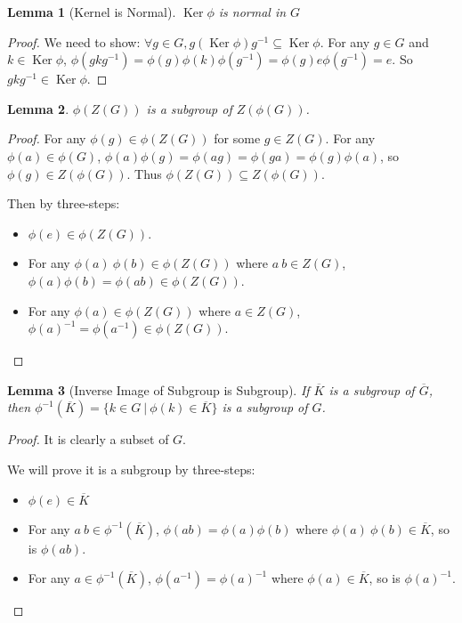 \documentclass[14pt]{extarticle}
\newtheorem{lemma}{Lemma}[section]
\DeclareMathOperator{\Ker}{Ker}
\newcommand{\inv}[1]{#1^{-1}}
\newcommand{\1}{\{e\}}
\begin{document}
\begin{lemma}[Kernel is Normal]
  $\Ker \phi$ is normal in $G$
\end{lemma}
\begin{proof}
  We need to show: $\forall g \in G, g (\Ker\phi) \inv{g} \subseteq \Ker\phi$.
  For any $g \in G$ and $k \in \Ker\phi$, 
  $\phi(gk\inv{g}) = \phi(g)\phi(k)\phi(\inv{g}) = \phi(g)e\phi(\inv{g}) = e$.
  So $gk\inv{g} \in \Ker\phi$.
\end{proof}

\begin{lemma}
  $\phi(Z(G))$ is a subgroup of $Z(\phi(G))$.
\end{lemma}
\begin{proof}
  For any $\phi(g) \in \phi(Z(G))$ for some $g \in Z(G)$. 
  For any $\phi(a) \in \phi(G)$,
  $\phi(a)\phi(g) = \phi(ag) = \phi(ga) = \phi(g)\phi(a)$, so $\phi(g) \in Z(\phi(G))$.
  Thus $\phi(Z(G)) \subseteq Z(\phi(G))$.

  Then by three-steps:

  \begin{itemize}
    \item $\phi(e) \in \phi(Z(G))$.
    \item For any $\phi(a) \ \phi(b) \in \phi(Z(G))$ where $a \ b \in Z(G)$, $\phi(a)\phi(b) = \phi(ab) \in \phi(Z(G))$.
    \item For any $\phi(a) \in \phi(Z(G))$ where $a \in Z(G)$, $\inv{\phi(a)} = \phi(\inv{a}) \in \phi(Z(G))$.
  \end{itemize}
\end{proof}

\begin{lemma}[Inverse Image of Subgroup is Subgroup]
  If $\overline{K}$ is a subgroup of $\overline{G}$, 
  then $\inv{\phi}(\overline{K}) = \{ k \in G \ | \ \phi(k) \in \overline{K} \}$
  is a subgroup of $G$.
\end{lemma}
\begin{proof}
  It is clearly a subset of $G$.

  We will prove it is a subgroup by three-steps:
  \begin{itemize}
    \item $\phi(e) \in \overline{K}$
    \item For any $a \ b \in \inv{\phi}(\overline{K})$,
      $\phi(ab) = \phi(a)\phi(b)$ where $\phi(a) \ \phi(b) \in \overline{K}$,
      so is $\phi(ab)$.
    \item For any $a \in \inv{\phi}(\overline{K})$,
      $\phi(\inv{a}) = \inv{\phi(a)}$ where $\phi(a) \in \overline{K}$,
      so is $\inv{\phi(a)}$.
  \end{itemize}
\end{proof}
\end{document}
